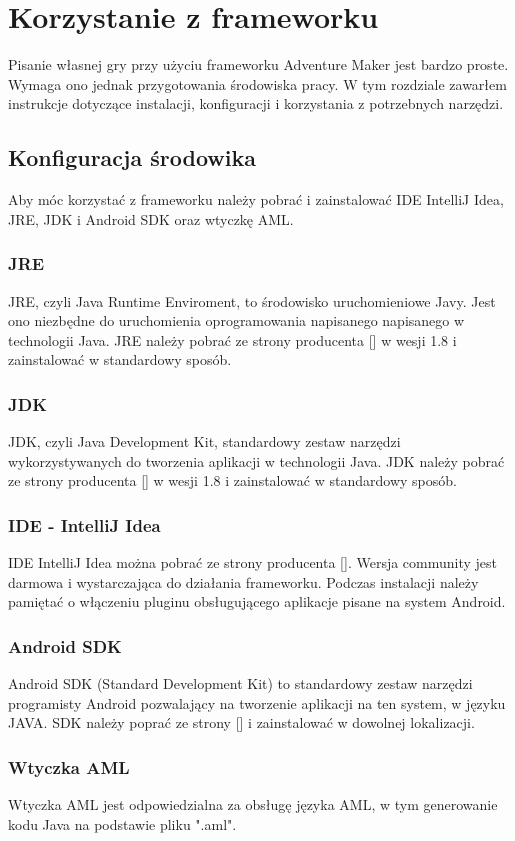 \documentclass	{xmgr}
\begin{document}
\chapter{Korzystanie z frameworku}
Pisanie własnej gry przy użyciu frameworku Adventure Maker jest bardzo proste. Wymaga ono jednak przygotowania środowiska pracy.
W tym rozdziale zawarłem instrukcje dotyczące instalacji, konfiguracji i korzystania z potrzebnych narzędzi. 
\section{Konfiguracja środowika}
Aby móc korzystać z frameworku należy pobrać i zainstalować IDE IntelliJ Idea, JRE, JDK i Android SDK oraz wtyczkę AML.
\subsection{JRE}
JRE, czyli Java Runtime Enviroment, to środowisko uruchomieniowe Javy. Jest ono niezbędne do uruchomienia oprogramowania napisanego napisanego w technologii Java. JRE należy pobrać ze strony producenta [] w wesji 1.8 i zainstalować w standardowy sposób.
\subsection{JDK}
JDK, czyli Java Development Kit, standardowy zestaw narzędzi wykorzystywanych do tworzenia aplikacji w technologii Java. JDK należy pobrać ze strony producenta [] w wesji 1.8 i zainstalować w standardowy sposób.
\subsection{IDE - IntelliJ Idea}
IDE IntelliJ Idea można pobrać ze strony producenta []. Wersja community jest darmowa i wystarczająca do działania frameworku.
Podczas instalacji należy pamiętać o włączeniu pluginu obsługującego aplikacje pisane na system Android.
\subsection{Android SDK}
Android SDK (Standard Development Kit) to standardowy zestaw narzędzi programisty Android pozwalający na tworzenie aplikacji na ten system, w języku JAVA. SDK należy poprać ze strony [] i zainstalować w dowolnej lokalizacji.
\subsection{Wtyczka AML}
Wtyczka AML jest odpowiedzialna za obsługę języka AML, w tym generowanie kodu Java na podstawie pliku ".aml". 
\end{document}
